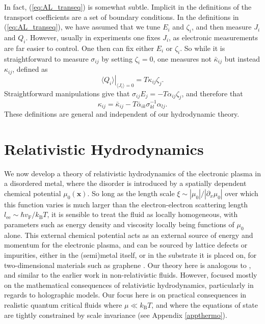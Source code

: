 In fact, (\ref{eq:AL_transeq}) is somewhat subtle.   Implicit in the definitions of the transport coefficients are a set of boundary conditions.   In the definitions in (\ref{eq:AL_transeq}), we have assumed that we tune $E_i$ and $ \zeta_i$, and then measure $ J_i$ and $Q_i$.   However, usually in experiments one fixes $J_i$, as electronic measurements are far easier to control.  One then can fix either $E_i$ or $\zeta_i$. So while it is straightforward to measure $\sigma_{ij}$ by setting $\zeta_i=0$,  one measures not $\bar{\kappa}_{ij}$ but instead $\kappa_{ij}$, defined as \begin{equation}
\left.\langle  Q_i\rangle\right|_{\langle  J_i\rangle = 0} = T\kappa_{ij} \zeta_j.
\end{equation}Straightforward manipulations give that $\sigma_{ij}E_j = -T\alpha_{ij}\zeta_j$, and therefore that\begin{equation}
\kappa_{ij} = \bar\kappa_{ij} - T\bar\alpha_{ik}\sigma^{-1}_{kl}\alpha_{lj}.
\end{equation}
These definitions are general and independent of our hydrodynamic theory.




\section{Relativistic Hydrodynamics}\label{section:AL_sechydro}
We now develop a theory of relativistic hydrodynamics of the electronic plasma in a disordered metal, where the disorder is introduced by a spatially dependent chemical potential $\mu_0(\mathbf{x})$.    So long as the length scale $\xi \sim |\mu_0|/ |\partial_x \mu_0|$ over which this function varies is much larger than the electron-electron scattering length $l_{\mathrm{ee}} \sim \hbar v_{\mathrm{F}} /k_{\mathrm{B}}T$, it is sensible to treat the fluid as locally homogeneous, with parameters such as energy density and viscosity locally being functions of $\mu_0$ alone.  This external chemical potential acts as an external source of energy and momentum for the electronic plasma, and can be sourced by lattice defects or impurities, either in the (semi)metal itself, or in the substrate it is placed on, for two-dimensional materials such as graphene \cite{martin_observation_2008, xue_scanning_2011}.   Our theory here is  analogous to \cite{lucas_hydrodynamic_2015}, and similar to the earlier work \cite{andreev_hydrodynamic_2011} in non-relativistic fluids.   However, \cite{lucas_hydrodynamic_2015} focused mostly on the mathematical consequences of relativistic hydrodynamics, particularly in regards to holographic models.   Our focus here is on practical consequences in realistic quantum critical fluids where $\mu \ll k_{\mathrm{B}}T$, and where the equations of state are tightly constrained by scale invariance (see Appendix \ref{appthermo}).

